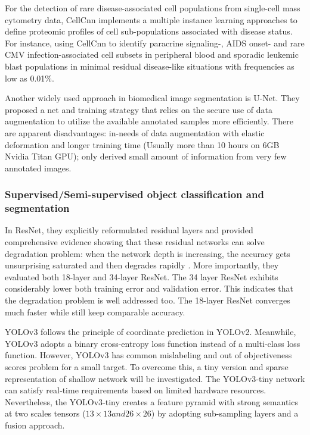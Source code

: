 For the detection of rare disease-associated cell populations from single-cell mass cytometry data, CellCnn \cite{3} implements a multiple instance learning approaches to define proteomic profiles of cell sub-populations associated with disease status. For instance, using CellCnn to identify paracrine signaling-, AIDS onset- and rare CMV infection-associated cell subsets in peripheral blood and sporadic leukemic blast populations in minimal residual disease-like situations with frequencies as low as 0.01\%\cite{3}.

Another widely used approach in biomedical image segmentation is U-Net\cite{14}. They proposed a net and training strategy that relies on the secure use of data augmentation to utilize the available annotated samples more efficiently\cite{14}.
There are apparent disadvantages: in-needs of data augmentation with elastic deformation and longer training time (Usually more than 10 hours on 6GB Nvidia Titan GPU); only derived small amount of information from very few annotated images\cite{14}.

\subsubsection{Supervised/Semi-supervised object classification and segmentation}
In ResNet\cite{20}, they explicitly reformulated residual layers and provided comprehensive evidence showing that these residual networks can solve degradation problem: when the network depth is increasing, the accuracy gets unsurprising saturated and then degrades rapidly \cite{20}.
More importantly, they evaluated both 18-layer and 34-layer ResNet. The 34 layer ResNet exhibits considerably lower both training error and validation error. This indicates that the degradation problem is well addressed too. The 18-layer ResNet\cite{20} converges much faster while still keep comparable accuracy. 

YOLOv3 \cite{33} follows the principle of coordinate prediction in YOLOv2. 
Meanwhile, YOLOv3 adopts a binary cross-entropy loss function instead of a multi‐class loss function\cite{18}. However, YOLOv3 has common mislabeling and out of objectiveness scores problem for a small target. To overcome this, a tiny version and sparse representation of shallow network will be investigated. The YOLOv3‐tiny network can satisfy real‐time requirements based on limited hardware resources. Nevertheless, the YOLOv3‐tiny creates a feature pyramid with strong semantics at two scales tensors ($13 \times 13 and 26 \times 26$) by adopting sub-sampling layers and a fusion approach\cite{18}.

